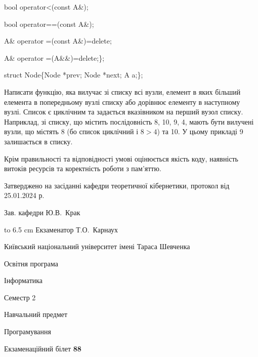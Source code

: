 \documentclass[12pt, ukrainian]{article}
\begin{document}
{\quad  bool operator<(const A\&); 

\quad  bool operator==(const A\&); 

\quad A\& operator =(const A\&)=delete; 

\quad  A\& operator =(A\&\&)=delete;\};

struct Node\{Node *prev; Node *next; A a;\};

Написати функцію, яка вилучає зі списку всі вузли, елемент в яких більший елемента в попередньому вузлі списку або дорівнює елементу в наступному вузлі. Список є циклічним та задається вказівником на перший вузол списку. Наприклад, зі списку, що містить послідовність 8, 10, 9, 4, мають бути вилучені вузли, що містять 8 (бо список циклічний і $8>4$) та 10. У цьому прикладі 9 залишається в списку.

Крім правильності та відповідності умові оцінюється якість коду, наявність витоків ресурсів та коректність роботи з пам'яттю. 

}
{\smallskip\smallskip \begin {scriptsize} Затверджено на засіданні кафедри теоретичної кібернетики, протокол   від   25.01.2024 р.\par\smallskip\smallskip\smallskip\smallskip
{\parbox {6.5 cm} {Зав. кафедри \dotfill Ю.В.~Крак}}\hspace {0.7cm} {\hbox to 6.5 cm { Екзаменатор \dotfill Т.О.~Карнаух}} \end{scriptsize}}
\newpage
{{\begin {scriptsize}\par
{ \center  Київський національний університет імені Тараса Шевченка \par}
{\parbox {5 cm}{Освітня програма \hfill}{\parbox {7 cm}{Інформатика\hfill}}\parbox {6 cm}{\hfill Семестр 2}}\par
{\parbox {5 cm} {Навчальний предмет \hfill}\parbox {7 cm}{Програмування \hfill}\parbox {6cm}{\hfill}\par}\vspace{-15pt} \end{scriptsize}}{\center Екзаменаційний білет \No \textbf { 88 }\par}}
\end{document}
